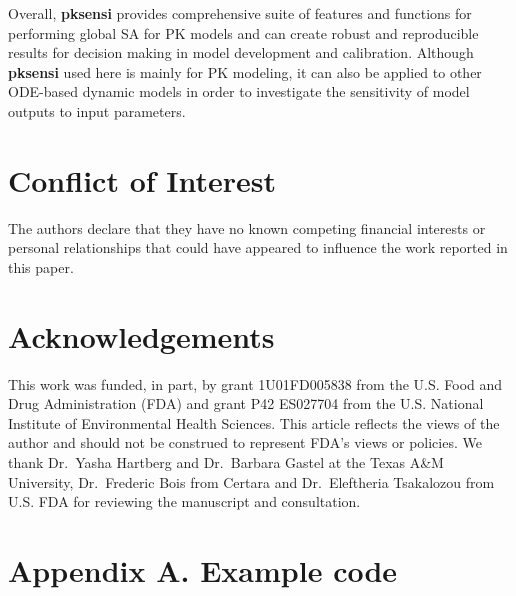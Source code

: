\documentclass[preprint,12pt, a4paper]{elsarticle}
\begin{document}
Overall, \textbf{pksensi} provides comprehensive suite of features and
functions for performing global SA for PK models and can create robust
and reproducible results for decision making in model development and
calibration. Although \textbf{pksensi} used here is mainly for PK
modeling, it can also be applied to other ODE-based dynamic models in
order to investigate the sensitivity of model outputs to input
parameters.

\section{Conflict of Interest}

The authors declare that they have no known competing financial interests or personal relationships that could have appeared to influence the work reported in this paper.

\section*{Acknowledgements}

This work was funded, in part, by grant 1U01FD005838 from the U.S. Food
and Drug Administration (FDA) and grant P42 ES027704 from the U.S.
National Institute of Environmental Health Sciences. This article
reflects the views of the author and should not be construed to
represent FDA's views or policies. We thank Dr.~Yasha Hartberg and
Dr.~Barbara Gastel at the Texas A\&M University, Dr.~Frederic Bois from
Certara and Dr.~Eleftheria Tsakalozou from U.S. FDA for reviewing the
manuscript and consultation.


\appendix
\section*{Appendix A. Example code}
\end{document}
